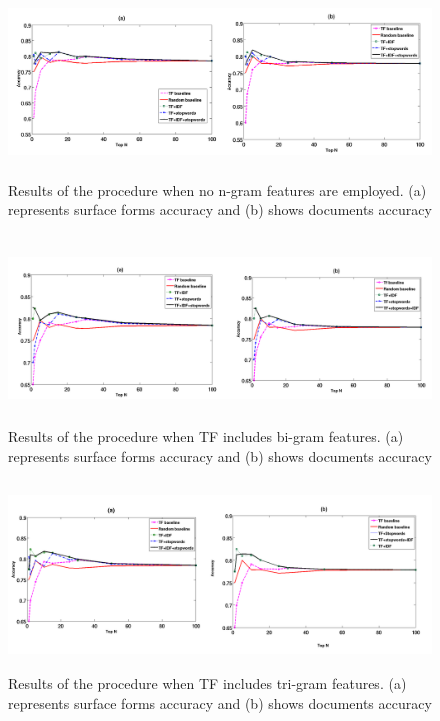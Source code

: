 \begin{figure}
\centering
\includegraphics[height=5cm, width=12.5cm]{normal}
\caption{Results of the procedure when no n-gram features are employed. (a) represents surface forms accuracy and (b) shows documents accuracy}
\label{fig1}
\end{figure}
\begin{figure}
\centering
\includegraphics[height=5cm, width=12.5cm]{bigrams}
\caption{Results of the procedure when TF includes bi-gram features. (a) represents surface forms accuracy and (b) shows documents accuracy}
\label{fig1}
\end{figure}
\begin{figure}
\centering
\includegraphics[height=5cm, width=12.5cm]{trigrams}
\caption{Results of the procedure when TF includes tri-gram features. (a) represents surface forms accuracy and (b) shows documents accuracy}
\label{fig1}
\end{figure}
